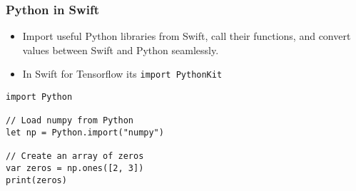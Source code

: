 \begin{frame}[fragile] \frametitle{Python in Swift}

\begin{itemize}
\item Import useful Python libraries from Swift, call their functions, and convert values between Swift and Python seamlessly.
\item In Swift for Tensorflow its \lstinline|import PythonKit|
\end{itemize}

\begin{lstlisting}
import Python

// Load numpy from Python
let np = Python.import("numpy")

// Create an array of zeros
var zeros = np.ones([2, 3])
print(zeros)
\end{lstlisting}
\end{frame}
